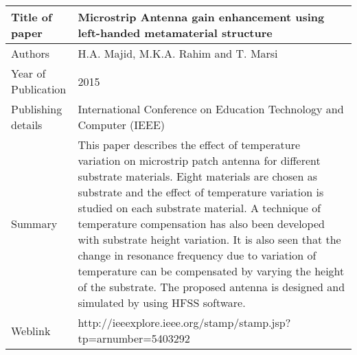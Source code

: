 \documentclass{article}
\begin{document}
\begin{table}
  \centering
	\begin{tabular}{ |l|p{11cm}| }
			\hline
		     Title of paper &  Microstrip Antenna gain enhancement using left-handed metamaterial structure \\
		     \hline
			 Authors & H.A. Majid, M.K.A. Rahim and T. Marsi \\
			\hline
			 Year of Publication & 2015 \\
			\hline
			 Publishing details & International Conference on Education Technology and Computer (IEEE) \\ \hline
			 Summary & This paper describes the effect of temperature variation on microstrip patch antenna for different substrate materials. Eight materials are chosen as substrate and the effect of temperature variation is studied on each substrate material. A technique of temperature compensation has also been developed with substrate height variation. It is also seen that the change in resonance frequency due to variation of temperature can be compensated by varying the height of the substrate. The proposed antenna is designed and simulated by using HFSS software.\\
			\hline
			 Weblink & http://ieeexplore.ieee.org/stamp/stamp.jsp?tp=arnumber=5403292 \\
			 \hline			 
	\end{tabular}		

\end{table}
\end{document}
